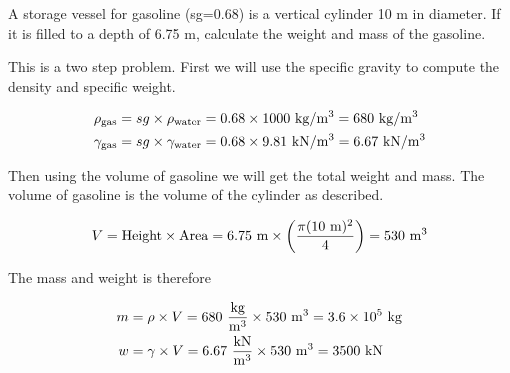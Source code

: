 \documentclass[multi,preview,varwidth=false,border=5,12pt]{standalone}
\begin{document}
\begin{question}
A storage vessel for gasoline (sg=0.68) is a vertical cylinder 10 m in diameter.  If it is filled to a depth of 6.75 m, calculate the weight and mass of the gasoline.

\begin{solution}
  This is a two step problem.  First we will use the specific gravity to compute the density and specific weight.

  \begin{align*}
    \rho_{\rm gas}&=sg\times \rho_{\rm water}=0.68\times 1000~\mathrm{kg}/\mathrm{m}^3=680~\mathrm{kg}/\mathrm{m}^3\\
    \gamma_{\rm gas}&=sg\times \gamma_{\rm water}=0.68\times 9.81~\mathrm{kN}/\mathrm{m}^3=6.67~\mathrm{kN}/\mathrm{m}^3
  \end{align*}

  Then using the volume of gasoline we will get the total weight and mass.  The volume of gasoline is the volume of the cylinder as described.

  \begin{align*}
      V={\rm Height}\times {\rm Area}=6.75~\mathrm{m}\times \left(\frac{\pi (10~\mathrm{m})^2}{4}\right)=530~\mathrm{m}^3
  \end{align*}

  The mass and weight is therefore

  \begin{align*}
      m&=\rho\times V=680~\frac{\mathrm{kg}}{\mathrm{m}^3}\times 530~\mathrm{m}^3 = 3.6\times 10^{5}~\mathrm{kg}\\
      w&=\gamma\times V=6.67~\frac{\mathrm{kN}}{\mathrm{m}^3}\times 530~\mathrm{m}^3 = 3500~\mathrm{kN}
  \end{align*}

\end{solution}

\end{question}
\end{document}
